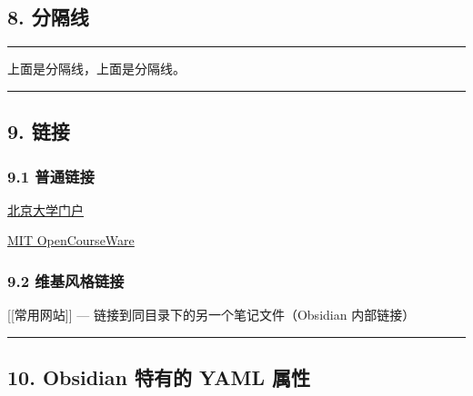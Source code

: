 \subsection{8. 分隔线}\label{ux5206ux9694ux7ebf}

\begin{center}\rule{0.5\linewidth}{0.5pt}\end{center}

上面是分隔线，上面是分隔线。

\begin{center}\rule{0.5\linewidth}{0.5pt}\end{center}

\subsection{9. 链接}\label{ux94feux63a5}

\subsubsection{9.1 普通链接}\label{ux666eux901aux94feux63a5}

\href{https://portal.pku.edu.cn/portal2017/}{北京大学门户}

\href{https://ocw.mit.edu/}{MIT OpenCourseWare}

\subsubsection{9.2
维基风格链接}\label{ux7ef4ux57faux98ceux683cux94feux63a5}

{[}{[}常用网站{]}{]} --- 链接到同目录下的另一个笔记文件（Obsidian
内部链接）

\begin{center}\rule{0.5\linewidth}{0.5pt}\end{center}

\subsection{10. Obsidian 特有的 YAML
属性}\label{obsidian-ux7279ux6709ux7684-yaml-ux5c5eux6027}

\begin{Shaded}
\begin{Highlighting}[]
\PreprocessorTok{{-}{-}{-}}
\KeywordTok{:}
\KeywordTok{:}
\AttributeTok{  }\KeywordTok{{-}}
\AttributeTok{  }\KeywordTok{{-}}
\KeywordTok{:}
\KeywordTok{:}
\KeywordTok{:}
\AttributeTok{  }\KeywordTok{{-}}
\PreprocessorTok{{-}{-}{-}}

\end{Highlighting}
\end{Shaded}

